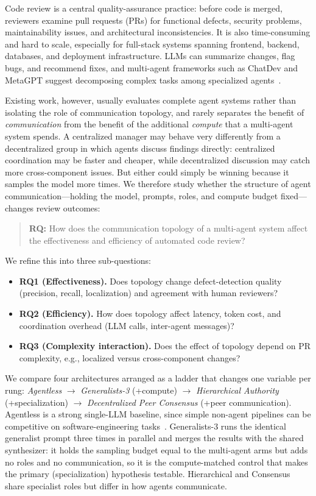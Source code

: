 \documentclass[conference]{IEEEtran}
\begin{document}
Code review is a central quality-assurance practice: before code is merged,
reviewers examine pull requests (PRs) for functional defects, security
problems, maintainability issues, and architectural inconsistencies. It is
also time-consuming and hard to scale, especially for full-stack systems
spanning frontend, backend, databases, and deployment infrastructure. LLMs
can summarize changes, flag bugs, and recommend fixes, and multi-agent
frameworks such as ChatDev and MetaGPT suggest decomposing complex tasks
among specialized agents~\cite{chatdev,metagpt}.

Existing work, however, usually evaluates complete agent systems rather than
isolating the role of communication topology, and rarely separates the
benefit of \emph{communication} from the benefit of the additional
\emph{compute} that a multi-agent system spends. A centralized manager may
behave very differently from a decentralized group in which agents discuss
findings directly: centralized coordination may be faster and cheaper, while
decentralized discussion may catch more cross-component issues. But either
could simply be winning because it samples the model more times. We
therefore study whether the structure of agent communication---holding the
model, prompts, roles, and compute budget fixed---changes review outcomes:

\begin{quote}
\textbf{RQ:} How does the communication topology of a multi-agent system
affect the effectiveness and efficiency of automated code review?
\end{quote}

We refine this into three sub-questions:
\begin{itemize}
  \item \textbf{RQ1 (Effectiveness).} Does topology change defect-detection
  quality (precision, recall, localization) and agreement with human
  reviewers?
  \item \textbf{RQ2 (Efficiency).} How does topology affect latency, token
  cost, and coordination overhead (LLM calls, inter-agent messages)?
  \item \textbf{RQ3 (Complexity interaction).} Does the effect of topology
  depend on PR complexity, e.g., localized versus cross-component changes?
\end{itemize}

We compare four architectures arranged as a ladder that changes one variable
per rung: \emph{Agentless} $\rightarrow$ \emph{Generalists-3} (+compute)
$\rightarrow$ \emph{Hierarchical Authority} (+specialization) $\rightarrow$
\emph{Decentralized Peer Consensus} (+peer communication). Agentless is a
strong single-LLM baseline, since simple non-agent pipelines can be
competitive on software-engineering tasks~\cite{agentless}. Generalists-3
runs the identical generalist prompt three times in parallel and merges the
results with the shared synthesizer: it holds the sampling budget equal to
the multi-agent arms but adds no roles and no communication, so it is the
compute-matched control that makes the primary (specialization) hypothesis
testable. Hierarchical and Consensus share specialist roles but differ in
how agents communicate.
\end{document}

